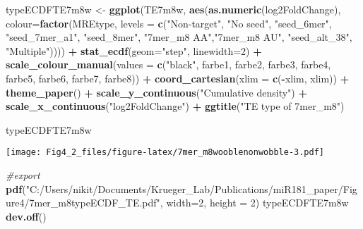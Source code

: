 \documentclass[
]{article}
\newenvironment{Shaded}{\begin{snugshade}}{\end{snugshade}}
\newcommand{\AttributeTok}[1]{\textcolor[rgb]{0.13,0.29,0.53}{#1}}
\newcommand{\CommentTok}[1]{\textcolor[rgb]{0.56,0.35,0.01}{\textit{#1}}}
\newcommand{\DecValTok}[1]{\textcolor[rgb]{0.00,0.00,0.81}{#1}}
\newcommand{\FunctionTok}[1]{\textcolor[rgb]{0.13,0.29,0.53}{\textbf{#1}}}
\newcommand{\NormalTok}[1]{#1}
\newcommand{\OtherTok}[1]{\textcolor[rgb]{0.56,0.35,0.01}{#1}}
\newcommand{\SpecialCharTok}[1]{\textcolor[rgb]{0.81,0.36,0.00}{\textbf{#1}}}
\newcommand{\StringTok}[1]{\textcolor[rgb]{0.31,0.60,0.02}{#1}}
\begin{document}
\begin{Shaded}
\begin{Highlighting}[]
\NormalTok{typeECDFTE7m8w }\OtherTok{\textless{}{-}} \FunctionTok{ggplot}\NormalTok{(TE7m8w, }\FunctionTok{aes}\NormalTok{(}\FunctionTok{as.numeric}\NormalTok{(log2FoldChange), }
                              \AttributeTok{colour=}\FunctionTok{factor}\NormalTok{(MREtype, }\AttributeTok{levels =} \FunctionTok{c}\NormalTok{(}\StringTok{"Non{-}target"}\NormalTok{, }\StringTok{"No seed"}\NormalTok{, }\StringTok{"seed\_6mer"}\NormalTok{, }\StringTok{"seed\_7mer\_a1"}\NormalTok{, }\StringTok{"seed\_8mer"}\NormalTok{, }\StringTok{"7mer\_m8 AA"}\NormalTok{,}\StringTok{"7mer\_m8 AU"}\NormalTok{, }\StringTok{"seed\_alt\_38"}\NormalTok{, }\StringTok{"Multiple"}\NormalTok{)))) }\SpecialCharTok{+} 
  \FunctionTok{stat\_ecdf}\NormalTok{(}\AttributeTok{geom=}\StringTok{"step"}\NormalTok{, }\AttributeTok{linewidth=}\DecValTok{2}\NormalTok{) }\SpecialCharTok{+}
  \FunctionTok{scale\_colour\_manual}\NormalTok{(}\AttributeTok{values =} \FunctionTok{c}\NormalTok{(}\StringTok{"black"}\NormalTok{, farbe1, farbe2, farbe3, farbe4, farbe5, farbe6, farbe7, farbe8)) }\SpecialCharTok{+}
  \FunctionTok{coord\_cartesian}\NormalTok{(}\AttributeTok{xlim =} \FunctionTok{c}\NormalTok{(}\SpecialCharTok{{-}}\NormalTok{xlim, xlim)) }\SpecialCharTok{+} 
  \FunctionTok{theme\_paper}\NormalTok{() }\SpecialCharTok{+}
  \FunctionTok{scale\_y\_continuous}\NormalTok{(}\StringTok{"Cumulative density"}\NormalTok{) }\SpecialCharTok{+} \FunctionTok{scale\_x\_continuous}\NormalTok{(}\StringTok{"log2FoldChange"}\NormalTok{) }\SpecialCharTok{+}
  \FunctionTok{ggtitle}\NormalTok{(}\StringTok{"TE type of 7mer\_m8"}\NormalTok{)}

\NormalTok{typeECDFTE7m8w}
\end{Highlighting}
\end{Shaded}

\texttt{[image: Fig4\_2\_files/figure-latex/7mer\_m8wooblenonwobble-3.pdf]}

\begin{Shaded}
\begin{Highlighting}[]
\CommentTok{\#export}
\FunctionTok{pdf}\NormalTok{(}\StringTok{"C:/Users/nikit/Documents/Krueger\_Lab/Publications/miR181\_paper/Figure4/7mer\_m8typeECDF\_TE.pdf"}\NormalTok{, }\AttributeTok{width=}\DecValTok{2}\NormalTok{, }\AttributeTok{height =} \DecValTok{2}\NormalTok{)}
\NormalTok{typeECDFTE7m8w}
\FunctionTok{dev.off}\NormalTok{()}
\end{Highlighting}
\end{Shaded}
\end{document}
